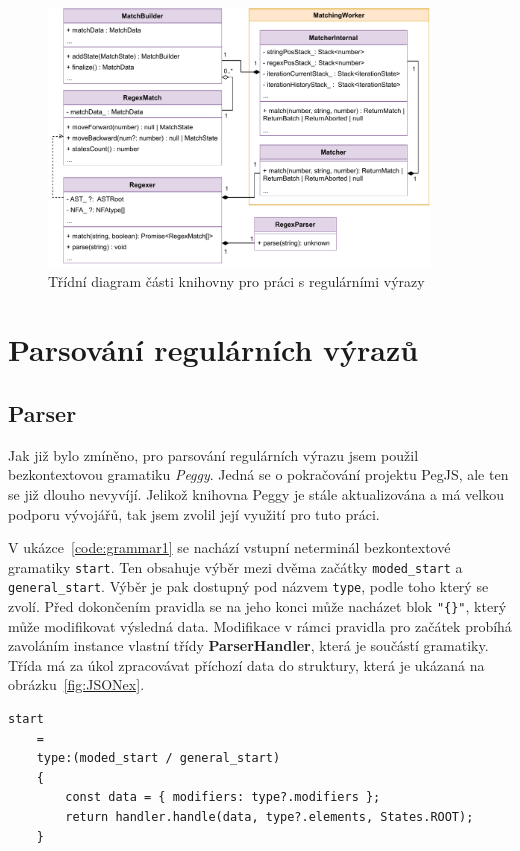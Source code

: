\begin{figure}[!h]
	\centering
	\includegraphics[width=0.9\textwidth]{Figures/UML_RGXR.pdf}
	\caption{Třídní diagram části knihovny pro práci s regulárními výrazy}
	\label{fig:ARCH_RGXR}
\end{figure} 

\section{Parsování regulárních výrazů}\label{sec:Parse}

\subsection*{Parser}

Jak již bylo zmíněno, pro parsování regulárních výrazu jsem použil bezkontextovou gramatiku \textit{Peggy}.
Jedná se o pokračování projektu PegJS, ale ten se již dlouho nevyvíjí. 
Jelikož knihovna Peggy je stále aktualizována a má velkou podporu vývojářů, tak jsem zvolil její využití pro tuto práci.

V ukázce~\ref{code:grammar1} se nachází vstupní neterminál bezkontextové gramatiky \texttt{start}. 
Ten obsahuje výběr mezi dvěma začátky \texttt{moded\_start} a \texttt{general\_start}.
Výběr je pak dostupný pod názvem \texttt{type}, podle toho který se zvolí.
Před dokončením pravidla se na jeho konci může nacházet blok \texttt{"\{\}"}, který může modifikovat výsledná data.
Modifikace v rámci pravidla pro začátek probíhá zavoláním instance vlastní třídy \textbf{ParserHandler}, která je součástí gramatiky.
Třída má za úkol zpracovávat příchozí data do struktury, která je ukázaná na obrázku~\ref{fig:JSONex}.

\begin{code}[!ht]
	\begin{verbatim}
start 
	= 
	type:(moded_start / general_start)
	{
		const data = { modifiers: type?.modifiers };
		return handler.handle(data, type?.elements, States.ROOT);
	}
	\end{verbatim}
	\caption{Jednoduché pravidlo gramatiky}
	\label{code:grammar1}
\end{code}

